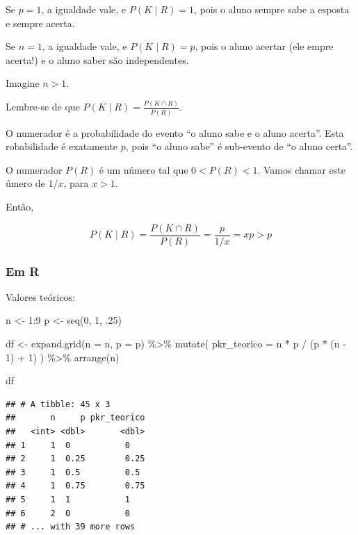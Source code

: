 \documentclass[
  11pt]{report}
\newenvironment{Shaded}{\begin{snugshade}}{\end{snugshade}}
\newcommand{\AttributeTok}[1]{\textcolor[rgb]{0.77,0.63,0.00}{#1}}
\newcommand{\DecValTok}[1]{\textcolor[rgb]{0.00,0.00,0.81}{#1}}
\newcommand{\FunctionTok}[1]{\textcolor[rgb]{0.00,0.00,0.00}{#1}}
\newcommand{\NormalTok}[1]{#1}
\newcommand{\OtherTok}[1]{\textcolor[rgb]{0.56,0.35,0.01}{#1}}
\newcommand{\SpecialCharTok}[1]{\textcolor[rgb]{0.00,0.00,0.00}{#1}}
\renewenvironment{Shaded}{
    \begin{mdframed}[%
      roundcorner=2pt,%
      innerleftmargin=5pt,%
      innerrightmargin=5pt,%
      topline=true,%
      leftline=true,%
      rightline=true,%
      bottomline=true,%
      linewidth=0.5pt,%
      linecolor=black!20,%
      backgroundcolor=black!2,%
      skipabove=2ex,%
      skipbelow=2.5ex%
    ]%
  }
  {
    \end{mdframed}
  }
\begin{document}
Se $p = 1$, a igualdade vale, e $P(K \mid R) = 1$, pois o aluno sempre sabe a esposta e sempre acerta.

Se $n = 1$, a igualdade vale, e $P(K \mid R) = p$, pois o aluno acertar (ele empre acerta!) e o aluno saber são independentes.

Imagine $n > 1$.

Lembre-se de que $P(K \mid R) = \frac{P(K \cap R)}{P(R)}$.

O numerador é a probabilidade do evento ``o aluno sabe e o aluno acerta''. Esta robabilidade é exatamente $p$, pois ``o aluno sabe'' é sub-evento de ``o aluno certa''.

O numerador $P(R)$ é um número tal que $0 < P(R) < 1$. Vamos chamar este úmero de $1/x$, para $x > 1$.

Então,

\[
 P(K \mid R) = \frac{P(K \cap R)}{P(R)} = \frac{p}{1/x} = xp > p
 \]

\hypertarget{em-r}{%
\subsubsection*{Em R}\label{em-r}}

Valores teóricos:

\begin{Shaded}
\begin{Highlighting}[]
\NormalTok{n }\OtherTok{\textless{}{-}} \DecValTok{1}\SpecialCharTok{:}\DecValTok{9}
\NormalTok{p }\OtherTok{\textless{}{-}} \FunctionTok{seq}\NormalTok{(}\DecValTok{0}\NormalTok{, }\DecValTok{1}\NormalTok{, .}\DecValTok{25}\NormalTok{)}

\NormalTok{df }\OtherTok{\textless{}{-}} \FunctionTok{expand.grid}\NormalTok{(}\AttributeTok{n =}\NormalTok{ n, }\AttributeTok{p =}\NormalTok{ p) }\SpecialCharTok{\%\textgreater{}\%} 
  \FunctionTok{mutate}\NormalTok{(}
    \AttributeTok{pkr\_teorico =}\NormalTok{ n }\SpecialCharTok{*}\NormalTok{ p }\SpecialCharTok{/}\NormalTok{ (p }\SpecialCharTok{*}\NormalTok{ (n }\SpecialCharTok{{-}} \DecValTok{1}\NormalTok{) }\SpecialCharTok{+} \DecValTok{1}\NormalTok{)}
\NormalTok{  ) }\SpecialCharTok{\%\textgreater{}\%} 
  \FunctionTok{arrange}\NormalTok{(n)}

\NormalTok{df}
\end{Highlighting}
\end{Shaded}

\begin{verbatim}
## # A tibble: 45 x 3
##       n     p pkr_teorico
##   <int> <dbl>       <dbl>
## 1     1  0           0   
## 2     1  0.25        0.25
## 3     1  0.5         0.5 
## 4     1  0.75        0.75
## 5     1  1           1   
## 6     2  0           0   
## # ... with 39 more rows
\end{verbatim}
\end{document}
